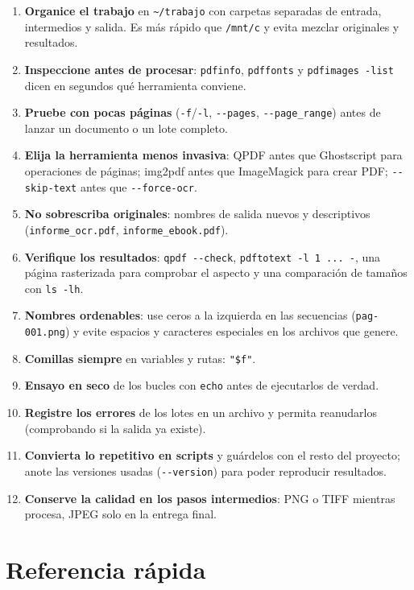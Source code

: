 \documentclass[11pt,a4paper]{article}
\newcommand{\cmd}[1]{\texttt{\textcolor{colcmd}{#1}}}      %
\newcommand{\opt}[1]{\texttt{\textcolor{colopt}{#1}}}      %
\newcommand{\arch}[1]{\texttt{\textcolor{colarch}{#1}}}    %
\newcommand{\tl}{\textasciitilde{}}  %
\begin{document}
	\begin{enumerate}
		\item \textbf{Organice el trabajo} en \arch{\tl/trabajo} con carpetas separadas de entrada, intermedios y salida. Es más rápido que \arch{/mnt/c} y evita mezclar originales y resultados.
		\item \textbf{Inspeccione antes de procesar}: \cmd{pdfinfo}, \cmd{pdffonts} y \cmd{pdfimages -list} dicen en segundos qué herramienta conviene.
		\item \textbf{Pruebe con pocas páginas} (\opt{-f}/\opt{-l}, \opt{-{}-pages}, \opt{-{}-page\_range}) antes de lanzar un documento o un lote completo.
		\item \textbf{Elija la herramienta menos invasiva}: QPDF antes que Ghostscript para operaciones de páginas; img2pdf antes que ImageMagick para crear PDF; \opt{-{}-skip-text} antes que \opt{-{}-force-ocr}.
		\item \textbf{No sobrescriba originales}: nombres de salida nuevos y descriptivos (\arch{informe\_\allowbreak{}ocr.pdf}, \arch{informe\_\allowbreak{}ebook.pdf}).
		\item \textbf{Verifique los resultados}: \cmd{qpdf -{}-check}, \cmd{pdftotext -l 1 ... -}, una página rasterizada para comprobar el aspecto y una comparación de tamaños con \cmd{ls -lh}.
		\item \textbf{Nombres ordenables}: use ceros a la izquierda en las secuencias (\arch{pag-001.png}) y evite espacios y caracteres especiales en los archivos que genere.
		\item \textbf{Comillas siempre} en variables y rutas: \texttt{"\$f"}.
		\item \textbf{Ensayo en seco} de los bucles con \cmd{echo} antes de ejecutarlos de verdad.
		\item \textbf{Registre los errores} de los lotes en un archivo y permita reanudarlos (comprobando si la salida ya existe).
		\item \textbf{Convierta lo repetitivo en scripts} y guárdelos con el resto del proyecto; anote las versiones usadas (\cmd{-{}-version}) para poder reproducir resultados.
		\item \textbf{Conserve la calidad en los pasos intermedios}: PNG o TIFF mientras procesa, JPEG solo en la entrega final.
	\end{enumerate}
	
	\appendix
	\clearpage
	\section{Referencia rápida}\label{sec:refrapida}
	
\end{document}
